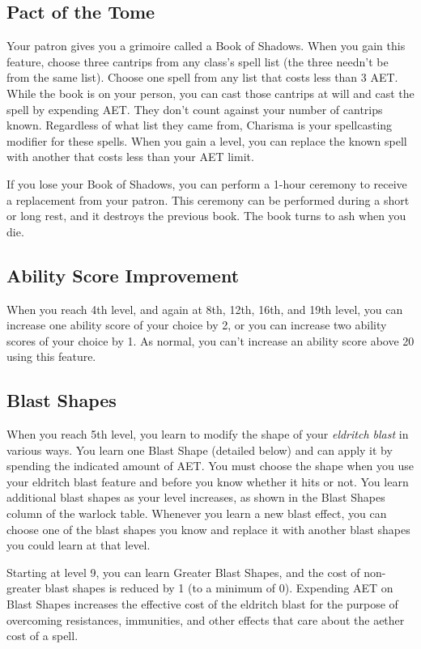 \subsection{Pact of the Tome}

Your patron gives you a grimoire called a Book of Shadows. When you gain this feature, choose three cantrips from any class's spell list (the three needn't be from the same list). Choose one spell from any list that costs less than 3 AET. While the book is on your person, you can cast those cantrips at will and cast the spell by expending AET. They don't count against your number of cantrips known. Regardless of what list they came from, Charisma is your spellcasting modifier for these spells. When you gain a level, you can replace the known spell with another that costs less than your AET limit.

If you lose your Book of Shadows, you can perform a 1-hour ceremony to receive a replacement from your patron. This ceremony can be performed during a short or long rest, and it destroys the previous book. The book turns to ash when you die.

\subsection{Ability Score Improvement}

When you reach 4th level, and again at 8th, 12th, 16th, and 19th level, you can increase one ability score of your choice by 2, or you can increase two ability scores of your choice by 1. As normal, you can't increase an ability score above 20 using this feature.

\subsection{Blast Shapes}

When you reach 5th level, you learn to modify the shape of your \textit{eldritch blast} in various ways. You learn one Blast Shape (detailed below) and can apply it by spending the indicated amount of AET. You must choose the shape when you use your eldritch blast feature and before you know whether it hits or not. You learn additional blast shapes as your level increases, as shown in the Blast Shapes column of the warlock table. Whenever you learn a new blast effect, you can choose one of the blast shapes you know and replace it with another blast shapes you could learn at that level.

Starting at level 9, you can learn Greater Blast Shapes, and the cost of non-greater blast shapes is reduced by 1 (to a minimum of 0). Expending AET on Blast Shapes increases the effective cost of the eldritch blast for the purpose of overcoming resistances, immunities, and other effects that care about the aether cost of a spell.

